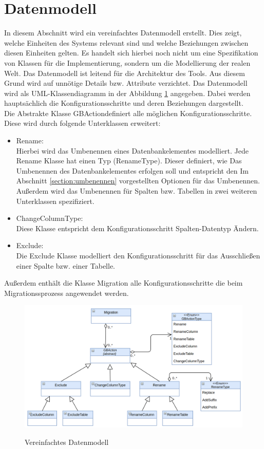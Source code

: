 \section{Datenmodell}
In diesem Abschnitt wird ein vereinfachtes Datenmodell erstellt. Dies zeigt, welche Einheiten des Systems relevant sind und welche Beziehungen zwischen diesen Einheiten gelten. Es handelt sich hierbei noch nicht um eine Spezifikation von Klassen für die Implementierung, sondern um
die Modellierung der realen Welt. Das Datenmodell ist leitend für die Architektur des Tools. Aus diesem Grund wird auf unnötige Details bzw. Attribute verzichtet.
Das Datenmodell wird als UML-Klassendiagramm in der Abbildung \ref{img:abstract-datenmodell} angegeben. Dabei werden hauptsächlich die Konfigurationsschritte und deren Beziehungen dargestellt. \\
Die Abstrakte Klasse \glqq GBAction\grqq definiert alle möglichen Konfigurationsschritte. Diese wird durch folgende Unterklassen erweitert:
\begin{itemize}
	\item Rename: \\
	Hierbei wird das Umbenennen eines Datenbankelementes modelliert. Jede Rename Klasse hat einen Typ (RenameType). Dieser definiert, wie Das Umbenennen des Datenbankelementes erfolgen soll und entspricht den Im Abschnitt \ref{section:umbenennen} vorgestellten Optionen für das Umbenennen. Außerdem wird das Umbenennen für Spalten bzw. Tabellen in zwei weiteren Unterklassen spezifiziert.
	\item ChangeColumnType: \\
	Diese Klasse entspricht dem Konfigurationsschritt \glqq Spalten-Datentyp Ändern\grqq.  
	\item Exclude: \\
	Die Exclude Klasse modelliert den Konfigurationsschritt für das Ausschließen einer Spalte bzw. einer Tabelle.
	\end{itemize}
Außerdem enthält die Klasse Migration alle Konfigurationsschritte die beim Migrationssprozess angewendet werden.
\begin{figure}[H]
	\caption{Vereinfachtes Datenmodell}
	\centering
	\includegraphics[width=\textwidth]{images/sichten/abstract-datenmodell}
	\label{img:abstract-datenmodell}
\end{figure}


